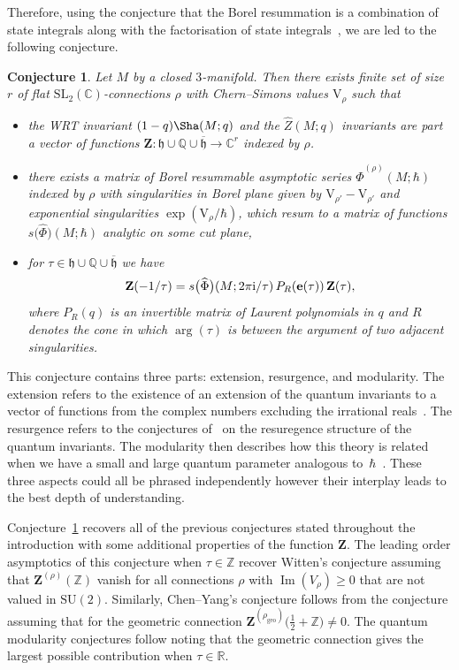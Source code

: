 \documentclass[pdftex]{sigma}
\numberwithin{equation}{section}
\newtheorem{Conjecture}[Theorem]{Conjecture}
\def\BZ{\mathbb{Z}}
\def\BQ{\mathbb{Q}}
\def\BR{\mathbb{R}}
\def\BC{\mathbb{C}}
\def\SL{\mathrm{SL}}
\def\e{\mathbf e}
\def\VC{\mathrm{VC}}
\def\SL{\mathrm{SL}}
\def\UHP{\mathfrak{h}}
\def\SU{\mathrm{SU}}
\def\WRT{\Sha}
\def\BZ{\mathbb Z}
\def\BQ{\mathbb Q}
\def\BR{\mathbb R}
\def\BC{\mathbb C}
\def\SL{\mathrm{SL}}
\def\Im{\operatorname{Im}}
\def\VC{\mathrm{V}}
\def\SU{\mathrm{SU}}
\begin{document}
Therefore, using the conjecture that the Borel resummation is a combination of state integrals along with the factorisation of state integrals~\cite{GK:rat,GK:qser}, we are led to the following conjecture.
\begin{Conjecture}\label{conj:theconj}
Let $M$ by a closed $3$-manifold. Then there exists finite set of size $r$ of flat $\SL_{2}(\BC)$-connections $\rho$ with Chern--Simons values $\VC_{\rho}$ such that
\begin{itemize}\itemsep=0pt
 \item the WRT invariant $(1-q)\WRT(M;q)$ and the $\widehat{Z}(M;q)$ invariants are part a vector of functions $\mathbf{Z}\colon \UHP\cup\BQ\cup\overline{\UHP}\rightarrow\BC^{r}$ indexed by $\rho$.
 \item there exists a matrix of Borel resummable asymptotic series $\widehat{\Phi}^{(\rho)}(M;\hbar)$ indexed by $\rho$ with singularities in Borel plane given by $\VC_{\rho'}-\VC_{\rho'}$ and exponential singularities $\exp(\VC_{\rho}/\hbar)$, which resum to a matrix of functions $s\bigl(\widehat{\Phi}\bigr)(M;\hbar)$ analytic on some cut plane,
 \item for $\tau\in\UHP\cup\BQ\cup\overline{\UHP}$ we have
 \[
 \mathbf{Z}(-1/\tau)
  =
 s\bigl(\widehat{\Phi}\bigr)(M;2\pi {\rm i}/\tau)\,P_{R}(\e(\tau))\,\mathbf{Z}(\tau) ,
 \]
 where $P_{R}(q)$ is an invertible matrix of Laurent polynomials in $q$ and $R$ denotes the cone in which $\arg(\tau)$ is between the argument of two adjacent singularities.
\end{itemize}
\end{Conjecture}
This conjecture contains three parts: extension, resurgence, and modularity. The extension refers to the existence of an extension of the quantum invariants to a vector of functions from the complex numbers excluding the irrational reals~\cite{GZ:qser,GZ:RQMOD}. The resurgence refers to the conjectures of~\cite{Gar:resCS,GGM:I} on the resuregence structure of the quantum invariants. The modularity then describes how this theory is related when we have a small and large quantum parameter analogous to~$\hbar$~\mbox{\cite{GZ:qser,GZ:RQMOD,Zagier:Qmod}}. These three aspects could all be phrased independently however their interplay leads to the best depth of understanding.



Conjecture~\ref{conj:theconj} recovers all of the previous conjectures stated throughout the introduction with some additional properties of the function $\mathbf{Z}$. The leading order asymptotics of this conjecture when $\tau\in\BZ$ recover Witten's conjecture assuming that $\mathbf{Z}^{(\rho)}(\BZ)$ vanish for all connections $\rho$ with $\Im(V_{\rho})\geq0$ that are not valued in $\SU(2)$. Similarly, Chen--Yang's conjecture follows from the conjecture assuming that for the geometric connection $\mathbf{Z}^{(\rho_{\mathrm{geo}})}\bigl(\tfrac{1}{2}+\BZ\bigr)\neq0$. The quantum modularity conjectures follow noting that the geometric connection gives the largest possible contribution when $\tau\in\BR$.
\end{document}
